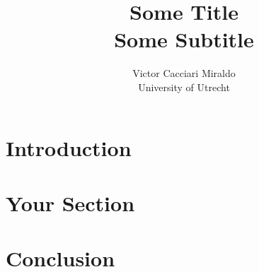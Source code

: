 \documentclass{article}
\title{Some Title \\ \small{%
Some Subtitle}}
\author{Victor Cacciari Miraldo \\ \small{%
University of Utrecht}}
\begin{document}
  \maketitle

\section{Introduction}


\section{Your Section}

\section{Conclusion}
  
\end{document}
